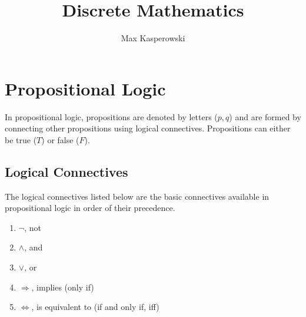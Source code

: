 \documentclass[a4paper, 10pt]{article}
\title{Discrete Mathematics}
\author{Max Kasperowski}
\begin{document}
\maketitle
\tableofcontents

\newpage
\section{Propositional Logic}
In propositional logic, propositions are denoted by letters (\(p, q\)) and are formed by connecting other propositions using logical connectives. Propositions can either be true (\(T\)) or false (\(F\)).
\subsection{Logical Connectives}
The logical connectives listed below are the basic connectives available in propositional logic in order of their precedence.
\begin{enumerate}
    \item \( \neg \), not
    \item \( \land \), and
    \item \( \lor \), or
    \item \( \Rightarrow \), implies (only if)
    \item \( \Leftrightarrow \), is equivalent to (if and only if, iff)
\end{enumerate}
\end{document}
